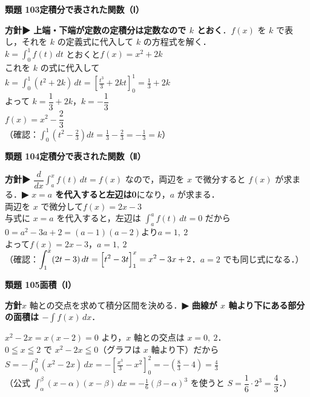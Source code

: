 \documentclass[a4paper,11pt]{ltjsarticle}
\newcommand{\ans}[2]{\Needspace{5\baselineskip}\vspace{6pt}%
  {\sffamily\bfseries 類題 #1\quad #2}\par}
\newcommand{\point}[1]{\textsf{\bfseries ▶ #1}}
\newcommand{\ax}[4]{\draw[->] (#1,0)--(#2,0) node[right]{\scriptsize $x$};
  \draw[->] (0,#3)--(0,#4) node[above]{\scriptsize $y$};
  \node[below left] at (0,0){\scriptsize O};}
\begin{document}
\ans{103}{定積分で表された関数（Ⅰ）}
\begin{kai}
\textbf{方針}\quad \point{上端・下端が定数の定積分は定数なので $k$ とおく}．$f(x)$ を $k$ で表し，それを $k$ の定義式に代入して $k$ の方程式を解く．\\[2pt]
$\displaystyle k=\int_0^1f(t)\,dt$ とおくと\quad $f(x)=x^2+2k$\\
これを $k$ の式に代入して\\
\hspace*{1.5em}$\displaystyle k=\int_0^1(t^2+2k)\,dt=\left[\frac{t^3}3+2kt\right]_0^1=\frac13+2k$\\
よって $k=\dfrac13+2k$，\quad $k=-\dfrac13$\\[2pt]
$f(x)=x^2-\dfrac23$\\
（確認：$\displaystyle\int_0^1\left(t^2-\frac23\right)dt=\frac13-\frac23=-\frac13=k$）
\end{kai}

\ans{104}{定積分で表された関数（Ⅱ）}
\begin{kai}
\textbf{方針}\quad \point{$\dfrac{d}{dx}\displaystyle\int_a^xf(t)\,dt=f(x)$} なので，両辺を $x$ で微分すると $f(x)$ が求まる．\point{$x=a$ を代入すると左辺は0}になり，$a$ が求まる．\\[2pt]
両辺を $x$ で微分して\quad $f(x)=2x-3$\\[2pt]
与式に $x=a$ を代入すると，左辺は $\displaystyle\int_a^af(t)\,dt=0$ だから\\
\hspace*{1.5em}$0=a^2-3a+2=(a-1)(a-2)$\quad より\quad $a=1,\ 2$\\[2pt]
よって\quad $f(x)=2x-3$，\quad $a=1,\ 2$\\
（確認：$\displaystyle\int_1^x(2t-3)\,dt=\Bigl[t^2-3t\Bigr]_1^x=x^2-3x+2$．$a=2$ でも同じ式になる．）
\end{kai}

\ans{105}{面積（Ⅰ）}
\begin{kai}
\textbf{方針}\quad $x$ 軸との交点を求めて積分区間を決める．\point{曲線が $x$ 軸より下にある部分の面積は $-\displaystyle\int f(x)\,dx$}．\\[2pt]
\begin{center}
\end{center}
$x^2-2x=x(x-2)=0$ より，$x$ 軸との交点は $x=0,\ 2$．\\
$0\leqq x\leqq2$ で $x^2-2x\leqq0$（グラフは $x$ 軸より下）だから\\[2pt]
$S=-\displaystyle\int_0^2(x^2-2x)\,dx=-\left[\frac{x^3}3-x^2\right]_0^2=-\left(\frac83-4\right)=\frac43$\\[2pt]
（公式 $\displaystyle\int_\alpha^\beta(x-\alpha)(x-\beta)\,dx=-\frac16(\beta-\alpha)^3$ を使うと $S=\dfrac16\cdot2^3=\dfrac43$．）
\end{kai}
\end{document}
